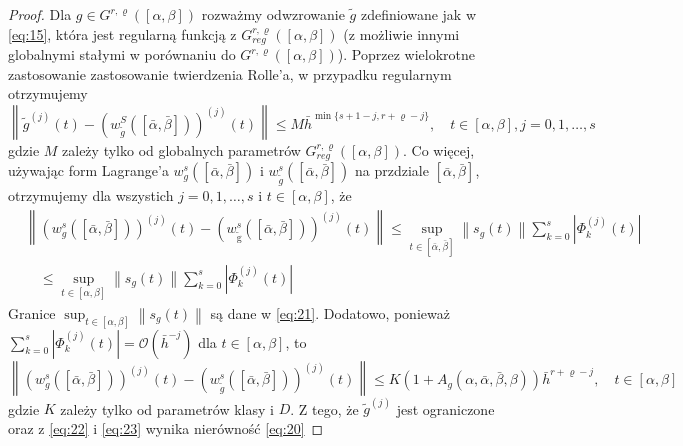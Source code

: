 \documentclass[oik, pdftex, robocza, man]{mgrwms}
\begin{document}
\begin{proof}
        Dla $g \in G^{r, \varrho}([\alpha, \beta])$ rozważmy odwzrowanie $\tilde{g}$ zdefiniowane jak w \eqref{eq:15}, która jest regularną funkcją z $G_{reg}^{r, \varrho}([\alpha, \beta])$ (z możliwie innymi globalnymi stałymi w porównaniu do $G^{r, \varrho}([\alpha, \beta])$). Poprzez wielokrotne zastosowanie zastosowanie twierdzenia Rolle'a, w przypadku regularnym otrzymujemy
        \begin{equation} \label{eq:21}
            \left\|\tilde{g}^{(j)}(t)-\left(w_{\tilde{g}}^{S}([\bar{\alpha}, \bar{\beta}])\right)^{(j)}(t)\right\| \leq M \bar{h}^{\min \{s+1-j, r+\varrho-j\}}, \quad t \in[\alpha, \beta], j=0,1, \ldots, s
        \end{equation}
        gdzie $M$ zależy tylko od globalnych parametrów $G_{reg}^{r, \varrho}([\alpha, \beta])$. Co więcej, używając form Lagrange'a $w_{g}^{s}([\bar{\alpha}, \bar{\beta}])$ i $w_{\tilde{g}}^{s}([\bar{\alpha}, \bar{\beta}])$ na przdziale $[\bar{\alpha}, \bar{\beta}]$, otrzymujemy dla wszystich $j=0,1, \ldots, s$ i $t \in[\alpha, \beta]$, że
        \begin{equation*}
            \begin{aligned}
                &\left\|\left(w_{g}^{s}([\bar{\alpha}, \bar{\beta}])\right)^{(j)}(t)-\left(w_{\tilde{\mathrm{g}}}^{s}([\bar{\alpha}, \bar{\beta}])\right)^{(j)}(t)\right\| \leq \sup _{t \in[\bar{\alpha}, \bar{\beta}]}\left\|s_{g}(t)\right\| \sum_{k=0}^{s}\left|\Phi_{k}^{(j)}(t)\right| \\
                &\quad \leq \sup _{t \in[\alpha, \beta]}\left\|s_{g}(t)\right\| \sum_{k=0}^{s}\left|\Phi_{k}^{(j)}(t)\right|
                \end{aligned}
        \end{equation*}
        Granice $\sup _{t \in[\alpha, \beta]}\left\|s_{g}(t)\right\|$ są dane w \eqref{eq:21}. 
        Dodatowo, ponieważ $\sum_{k=0}^{s}\left|\Phi_{k}^{(j)}(t)\right|=\mathcal{O}\left(\bar{h}^{-j}\right)$ dla $t \in[\alpha, \beta]$, to
        \begin{equation} \label{eq:23}
            \left\|\left(w_{g}^{s}([\bar{\alpha}, \bar{\beta}])\right)^{(j)}(t)-\left(w_{\tilde{g}}^{s}([\bar{\alpha}, \bar{\beta}])\right)^{(j)}(t)\right\| \leq K\left(1+A_{g}(\alpha, \bar{\alpha}, \bar{\beta}, \beta)\right) \bar{h}^{r+\varrho-j}, \quad t \in[\alpha, \beta]            
        \end{equation}
        gdzie $K$ zależy tylko od parametrów klasy i $D$. Z tego, że $\tilde{g}^{(j)}$ jest ograniczone oraz z \eqref{eq:22} i \eqref{eq:23} wynika nierówność \eqref{eq:20}
    \end{proof}
\end{document}
